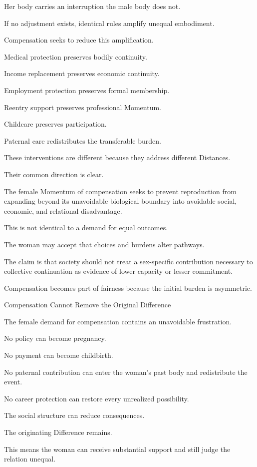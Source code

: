Her body carries an interruption the male body does not.

If no adjustment exists, identical rules amplify unequal embodiment.

Compensation seeks to reduce this amplification.

Medical protection preserves bodily continuity.

Income replacement preserves economic continuity.

Employment protection preserves formal membership.

Reentry support preserves professional Momentum.

Childcare preserves participation.

Paternal care redistributes the transferable burden.

These interventions are different because they address different Distances.

Their common direction is clear.

The female Momentum of compensation seeks to prevent reproduction from expanding beyond its unavoidable biological boundary into avoidable social, economic, and relational disadvantage.

This is not identical to a demand for equal outcomes.

The woman may accept that choices and burdens alter pathways.

The claim is that society should not treat a sex-specific contribution necessary to collective continuation as evidence of lower capacity or lesser commitment.

Compensation becomes part of fairness because the initial burden is asymmetric.

Compensation Cannot Remove the Original Difference

The female demand for compensation contains an unavoidable frustration.

No policy can become pregnancy.

No payment can become childbirth.

No paternal contribution can enter the woman’s past body and redistribute the event.

No career protection can restore every unrealized possibility.

The social structure can reduce consequences.

The originating Difference remains.

This means the woman can receive substantial support and still judge the relation unequal.

